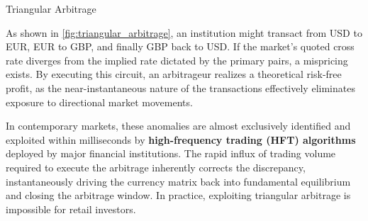 \documentclass[10pt]{article}
\begin{document}
\begin{core}{Triangular Arbitrage}

      As shown in \autoref{fig:triangular_arbitrage}, an institution might transact from USD to EUR, EUR to GBP, and finally GBP back to USD. If the market's quoted cross rate diverges from the implied rate dictated by the primary pairs, a mispricing exists. By executing this circuit, an arbitrageur realizes a theoretical risk-free profit, as the near-instantaneous nature of the transactions effectively eliminates exposure to directional market movements.

      In contemporary markets, these anomalies are almost exclusively identified and exploited within milliseconds by \textbf{high-frequency trading (HFT) algorithms} deployed by major financial institutions. The rapid influx of trading volume required to execute the arbitrage inherently corrects the discrepancy, instantaneously driving the currency matrix back into fundamental equilibrium and closing the arbitrage window. In practice, exploiting triangular arbitrage is impossible for retail investors.

    \end{core}
\end{document}
